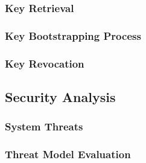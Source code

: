 			\subsubsection{Key Retrieval}

			\subsubsection{Key Bootstrapping Process}

			\subsubsection{Key Revocation}

		\subsection{Security Analysis}

			\subsubsection{System Threats}

			\subsubsection{Threat Model Evaluation}


